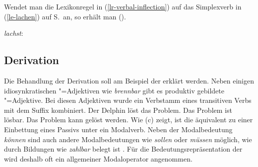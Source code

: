 Wendet man die Lexikonregel in (\ref{lr-verbal-inflection}) auf das Simplexverb
 in (\ref{le-lachen}) auf S.\,\pageref{le-lachen} an, so erhält man 
().

\eas
\label{le-lachst}%
\mbox{\emph{lachst}:}\\
\zs
{}







\subsection{Derivation}
\label{sec-bard}

Die Behandlung der Derivation soll am Beispiel der \bard erklärt werden. Neben einigen idiosynkratischen
"=Adjektiven wie \zb \emph{brennbar} gibt es produktiv gebildete "=Adjektive.
Bei diesen Adjektiven wurde ein Verbstamm eines transitiven Verbs mit dem Suffix  kombiniert.
\eal
\ex Der Delphin löst das Problem.
\ex Das Problem ist lösbar.
\ex Das Problem kann gelöst werden.
\zl
Wie (c) zeigt, ist die \bard äquivalent zu einer Einbettung eines Passivs unter ein Modalverb. Neben
der Modalbedeutung \emph{können} sind auch andere Modalbedeutungen wie \zb \emph{sollen} oder \emph{müssen}
möglich, wie durch Bildungen wie \emph{zahlbar} belegt ist \citep[292]{Gelhaus77}. Für die Bedeutungsrepräsentation der \bard wird
deshalb oft ein allgemeiner Modaloperator angenommen.

